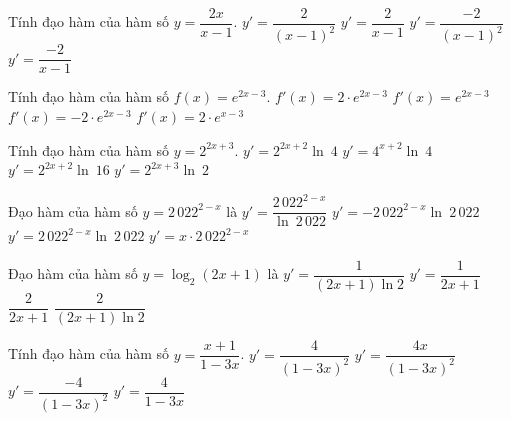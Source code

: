 \begin{ex}%
	Tính đạo hàm của hàm  số $y=\dfrac{2x}{x-1}$.
	\choice 
		{$y'=\dfrac{2}{(x-1)^2}$} 
		 {$y'=\dfrac{2}{x-1}$}
		{\True $y'=\dfrac{-2}{(x-1)^2}$} 
		 {$y'=\dfrac{-2}{x-1}$}
\end{ex}

\begin{ex}%
	Tính đạo hàm của hàm số  $f(x)=e^{2x-3}$.
	 \choice
		{\True  $f'(x)=2 \cdot e^{2x-3}$}
		 {$f'(x)=e^{2x-3}$}
		 {$f'(x)=-2 \cdot e^{2x-3}$}
		{$f'(x)=2 \cdot  e^{x-3}$}
\end{ex}

\begin{ex}%
	Tính đạo hàm của  hàm số $y=2^{2x+3}$.
	\choice 
		{$y'=2^{2x+2}\ln~4$} 
		 {$y'=4^{x+2}\ln~4$}
		{\True $y'=2^{2x+2}\ln~16$} 
		 {$y'=2^{2x+3}\ln~2$}
\end{ex}

\begin{ex}%
	Đạo hàm của  hàm số $y=2\, 022^{2-x}$ là
	\choice 
		{$y'=\dfrac{2\, 022^{2-x}}{\ln~2\, 022}$} 
		{\True $y'=-2\, 022^{2-x}\ln~2\, 022$} 
		{$y'=2\, 022^{2-x}\ln~2\,  022$}
		{$y'=x  \cdot 2\, 022^{2-x}$}
\end{ex}

\begin{ex}%
	Đạo hàm của hàm số  $y=\log_2 (2x+1)$ là
	\choice 
		{$y'=\dfrac{1}{(2x+1)\ln  2}$}
		 {$y'=\dfrac{1}{2x+1}$}
		{$\dfrac{2}{2x+1}$} 
		{\True $\dfrac{2}{(2x+1)\ln 2}$} 
\end{ex}

\begin{ex}%
	Tính đạo  hàm của hàm số $y=\dfrac{x+1}{1-3x}$.
	 \choice
		{\True  $y'=\dfrac{4}{(1-3x)^2}$}
		{$y'=\dfrac{4x}{(1-3x)^2}$} 
		{$y'=\dfrac{-4}{(1-3x)^2}$} 
		 {$y'=\dfrac{4}{1-3x}$}
\end{ex}

